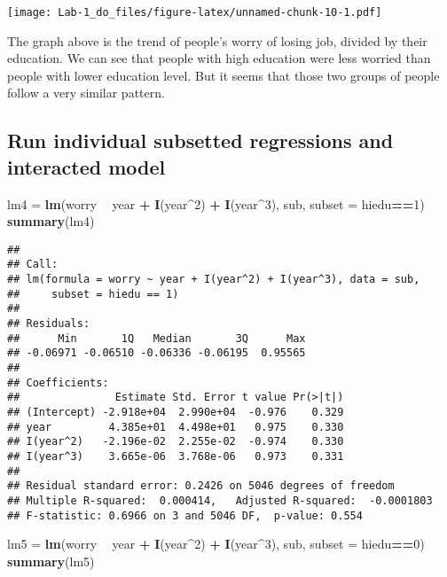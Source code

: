 \documentclass[]{article}
\newenvironment{Shaded}{\begin{snugshade}}{\end{snugshade}}
\newcommand{\DataTypeTok}[1]{\textcolor[rgb]{0.13,0.29,0.53}{#1}}
\newcommand{\DecValTok}[1]{\textcolor[rgb]{0.00,0.00,0.81}{#1}}
\newcommand{\KeywordTok}[1]{\textcolor[rgb]{0.13,0.29,0.53}{\textbf{#1}}}
\newcommand{\NormalTok}[1]{#1}
\newcommand{\OperatorTok}[1]{\textcolor[rgb]{0.81,0.36,0.00}{\textbf{#1}}}
\newcommand{\StringTok}[1]{\textcolor[rgb]{0.31,0.60,0.02}{#1}}
\begin{document}
\texttt{[image: Lab-1\_do\_files/figure-latex/unnamed-chunk-10-1.pdf]}

The graph above is the trend of people's worry of losing job, divided by
their education. We can see that people with high education were less
worried than people with lower education level. But it seems that those
two groups of people follow a very similar pattern.

\hypertarget{run-individual-subsetted-regressions-and-interacted-model}{%
\subsection{Run individual subsetted regressions and interacted
model}\label{run-individual-subsetted-regressions-and-interacted-model}}

\begin{Shaded}
\begin{Highlighting}[]
\NormalTok{lm4 =}\StringTok{ }\KeywordTok{lm}\NormalTok{(worry }\OperatorTok{~}\StringTok{ }\NormalTok{year }\OperatorTok{+}\StringTok{ }\KeywordTok{I}\NormalTok{(year}\OperatorTok{^}\DecValTok{2}\NormalTok{) }\OperatorTok{+}\StringTok{ }\KeywordTok{I}\NormalTok{(year}\OperatorTok{^}\DecValTok{3}\NormalTok{), sub, }\DataTypeTok{subset =}\NormalTok{ hiedu}\OperatorTok{==}\DecValTok{1}\NormalTok{)}
\KeywordTok{summary}\NormalTok{(lm4)}
\end{Highlighting}
\end{Shaded}

\begin{verbatim}
## 
## Call:
## lm(formula = worry ~ year + I(year^2) + I(year^3), data = sub, 
##     subset = hiedu == 1)
## 
## Residuals:
##      Min       1Q   Median       3Q      Max 
## -0.06971 -0.06510 -0.06336 -0.06195  0.95565 
## 
## Coefficients:
##               Estimate Std. Error t value Pr(>|t|)
## (Intercept) -2.918e+04  2.990e+04  -0.976    0.329
## year         4.385e+01  4.498e+01   0.975    0.330
## I(year^2)   -2.196e-02  2.255e-02  -0.974    0.330
## I(year^3)    3.665e-06  3.768e-06   0.973    0.331
## 
## Residual standard error: 0.2426 on 5046 degrees of freedom
## Multiple R-squared:  0.000414,   Adjusted R-squared:  -0.0001803 
## F-statistic: 0.6966 on 3 and 5046 DF,  p-value: 0.554
\end{verbatim}

\begin{Shaded}
\begin{Highlighting}[]
\NormalTok{lm5 =}\StringTok{ }\KeywordTok{lm}\NormalTok{(worry }\OperatorTok{~}\StringTok{ }\NormalTok{year }\OperatorTok{+}\StringTok{ }\KeywordTok{I}\NormalTok{(year}\OperatorTok{^}\DecValTok{2}\NormalTok{) }\OperatorTok{+}\StringTok{ }\KeywordTok{I}\NormalTok{(year}\OperatorTok{^}\DecValTok{3}\NormalTok{), sub, }\DataTypeTok{subset =}\NormalTok{ hiedu}\OperatorTok{==}\DecValTok{0}\NormalTok{)}
\KeywordTok{summary}\NormalTok{(lm5)}
\end{Highlighting}
\end{Shaded}
\end{document}
